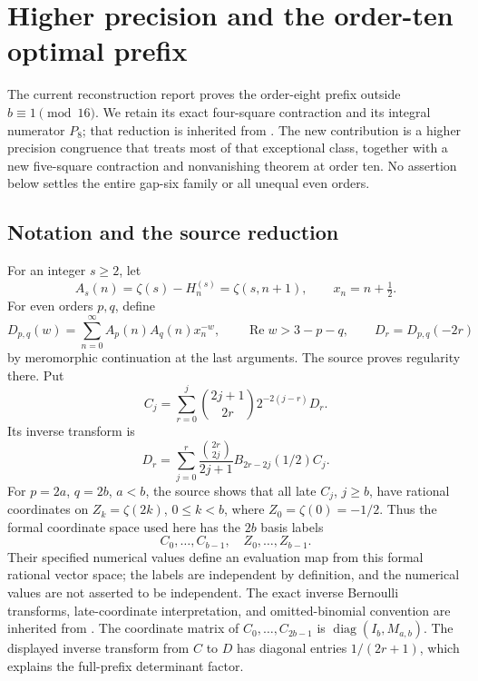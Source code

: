 \section{Higher precision and the order-ten optimal prefix}
\label{rt:section}

The current reconstruction report proves the order-eight prefix outside
$b\equiv1\pmod{16}$. We retain its exact four-square contraction and
its integral numerator $P_8$; that reduction is inherited from \cite{PRR}. The new
contribution is a higher precision congruence that treats most of that
exceptional class, together with a new five-square contraction and
nonvanishing theorem at order ten. No assertion below settles the
entire gap-six family or all unequal even orders.

\subsection{Notation and the source reduction}

For an integer $s\ge2$, let
\[
 A_s(n)=\zeta(s)-H_n^{(s)}=\zeta(s,n+1),\qquad x_n=n+\tfrac12.
\]
For even orders $p,q$, define
\[
 D_{p,q}(w)=\sum_{n=0}^{\infty}A_p(n)A_q(n)x_n^{-w},
 \qquad \operatorname{Re}w>3-p-q,
 \qquad D_r=D_{p,q}(-2r)
\]
by meromorphic continuation at the last arguments. The source proves
regularity there. Put
\[
 C_j=\sum_{r=0}^j\binom{2j+1}{2r}2^{-2(j-r)}D_r.
\]
Its inverse transform is
\[
 D_r=\sum_{j=0}^r\frac{\binom{2r}{2j}}{2j+1}
                  B_{2r-2j}(1/2)C_j.
\]
For $p=2a$, $q=2b$, $a<b$, the source shows that all late $C_j$,
$j\ge b$, have rational coordinates on
$Z_k=\zeta(2k)$, $0\le k<b$, where $Z_0=\zeta(0)=-1/2$.
Thus the formal coordinate space used here has the $2b$ basis labels
\[
 C_0,\ldots,C_{b-1},\quad Z_0,\ldots,Z_{b-1}.
\]
Their specified numerical values define an evaluation map from this
formal rational vector space; the labels are independent by definition,
and the numerical values are not asserted to be independent.
The exact inverse Bernoulli transforms, late-coordinate interpretation,
and omitted-binomial convention are inherited from \cite{BTDsource,PRR}.
The coordinate matrix of $C_0,\ldots,C_{2b-1}$ is
$\operatorname{diag}(I_b,M_{a,b})$. The displayed inverse transform
from $C$ to $D$ has diagonal entries $1/(2r+1)$, which explains
the full-prefix determinant factor.

